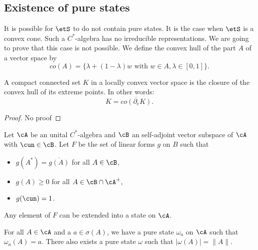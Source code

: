 \subsection{Existence of pure states}

It is possible for $\etS$ to do not contain pure states. It is the case when $\etS$ is a convex cone. Such a $C^*$-algebra  has no irreducible representations. We are going to prove that this case is not possible. We define the convex hull of the part $A$ of a vector space by
\[
  co(A)=\{ \lambda+(1-\lambda)w\text{ with }w\in A,\lambda\in[0,1] \}.
\]



\begin{theorem}
 A compact connected set $K$ in a locally convex vector space is the closure of the convex hull of its extreme points. In other words:
    \[
  K=\overline{ co(\partial_eK) }.
\]

\end{theorem}
\begin{proof}
No proof
\end{proof}


\begin{lemma}

 Let $\cA$ be an unital $C^*$-algebra  and $\cB$ an self-adjoint vector subspace of $\cA$ with $\cun\in\cB$. Let $F$ be the set of linear forms $g$ on $B$ such that


\begin{itemize}
\item  $g(A^*) = \overline{g(A)}$ for all $A\in\cB$,
 \item $g(A) \geq 0$ for all $A\in \cB\cap \cA^+$,
\item $g(\cun)=1$.
\end{itemize}
 Any element of $F$ can be extended into a state on $\cA$.
\label{lem_DixcBprol}
 \end{lemma}

\begin{theorem}
For all $A\in\cA$ and a $a\in\sigma(A)$, we have a pure state $\omega_a$ on $\cA$ such that $\omega_a(A)=a$. There also exists a pure state $\omega$ such that $| \omega(A) |=\| A \|$.
\label{tho_existsetat}
\end{theorem}

